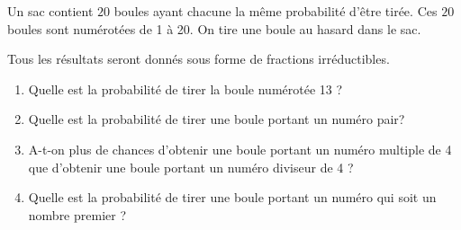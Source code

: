
Un sac contient $20$ boules ayant chacune la même probabilité d'être tirée. Ces $20$ boules sont numérotées de 1 à 20. On tire une boule au hasard dans le sac.

Tous les résultats seront donnés sous forme de fractions irréductibles.

\medskip

\begin{enumerate}
\item Quelle est la probabilité de tirer la boule numérotée 13 ?
\item Quelle est la probabilité de tirer une boule portant un numéro pair?
\item A-t-on plus de chances d'obtenir une boule portant un numéro multiple de 4 que d'obtenir une boule
portant un numéro diviseur de 4 ?
\item Quelle est la probabilité de tirer une boule portant un numéro qui soit un nombre premier ?
\end{enumerate}
